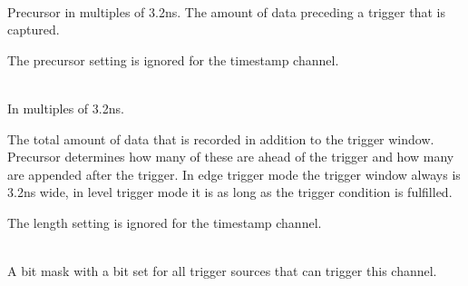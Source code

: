         \\
        Precursor in multiples of 3.2ns. The amount of data preceding a trigger that is captured.\par

        The precursor setting is ignored for the timestamp channel.\par

        \\
        In multiples of 3.2ns.\par

        The total amount of data that is recorded in addition to the trigger window. Precursor determines how many of these are ahead of the trigger and how many are appended after the trigger. In edge trigger mode the trigger window always is 3.2ns wide, in level trigger mode it is as long as the
trigger condition is fulfilled.\par

        The length setting is ignored for the timestamp channel.\par

        \\
        A bit mask with a bit set for all trigger sources that can trigger this channel.\par

